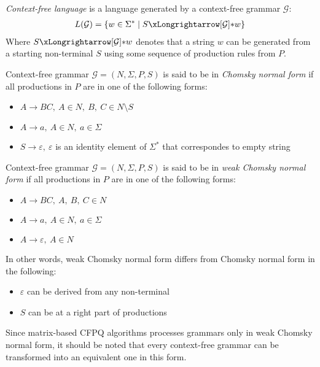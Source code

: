 \begin{definition} \emph{Context-free language} is a language generated by a context-free grammar $\mathcal{G}$:
\begin{align*}
     L(\mathcal{G}) = \{w \in \Sigma^* \mid S \xLongrightarrow[\mathcal{G}]{*} w \} 
\end{align*}
Where $S \xLongrightarrow[\mathcal{G}]{*} w$  denotes that a string $w$ can be generated from a starting non-terminal $S$ using some sequence of production rules from $P$.
\end{definition}

\begin{definition} Context-free grammar $\mathcal{G} = (N, \Sigma, P, S)$ is said to be in \emph{Chomsky normal form} if all productions in $P$ are in one of the following forms:
    \begin{itemize}
        \item $A \rightarrow BC,~A \in N,~B,~C \in N \setminus S$
        \item  $A \rightarrow a,~A \in N,~a \in \Sigma$
        \item $S \rightarrow \varepsilon,~\varepsilon$ is an identity element of $\Sigma^*$ that correspondes to empty string
    \end{itemize}
\end{definition}
\begin{definition} Context-free grammar $\mathcal{G} = (N, \Sigma, P, S)$ is said to be in \emph{weak Chomsky normal form} if all productions in $P$ are in one of the following forms:
    \begin{itemize}
        \item $A \rightarrow BC,~A,~B,~C \in N$
        \item  $A \rightarrow a,~A \in N,~a \in \Sigma$
        \item $A \rightarrow \varepsilon,~A \in N$
    \end{itemize}
\end{definition}
In other words, weak Chomsky normal form differs from Chomsky normal form in the following:
\begin{itemize}
    \item $\varepsilon$ can be derived from any non-terminal
    \item $S$ can be at a right part of productions
\end{itemize}
Since matrix-based CFPQ algorithms processes grammars only in weak Chomsky normal form, it should be noted that every context-free grammar can be transformed into an equivalent one in this form. 

